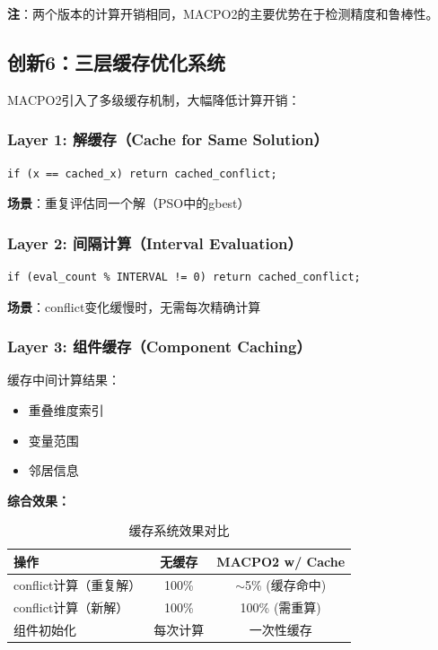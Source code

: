\documentclass[15pt,a3paper]{ctexart}
\begin{document}
\textbf{注}：两个版本的计算开销相同，MACPO2的主要优势在于检测精度和鲁棒性。


\subsection{创新6：三层缓存优化系统}

MACPO2引入了多级缓存机制，大幅降低计算开销：

\subsubsection{Layer 1: 解缓存（Cache for Same Solution）}

\begin{verbatim}
if (x == cached_x) return cached_conflict;
\end{verbatim}

\textbf{场景}：重复评估同一个解（PSO中的gbest）

\subsubsection{Layer 2: 间隔计算（Interval Evaluation）}

\begin{verbatim}
if (eval_count % INTERVAL != 0) return cached_conflict;
\end{verbatim}

\textbf{场景}：conflict变化缓慢时，无需每次精确计算

\subsubsection{Layer 3: 组件缓存（Component Caching）}

缓存中间计算结果：
\begin{itemize}
    \item 重叠维度索引
    \item 变量范围
    \item 邻居信息
\end{itemize}

\textbf{综合效果：}
\begin{table}[h]
\centering
\caption{缓存系统效果对比}
\begin{tabular}{|l|c|c|}
\hline
\textbf{操作} & \textbf{无缓存} & \textbf{MACPO2 w/ Cache} \\
\hline
conflict计算（重复解） & 100\% & $\sim$5\% (缓存命中) \\
conflict计算（新解） & 100\% & 100\% (需重算) \\
组件初始化 & 每次计算 & 一次性缓存 \\
\hline
\end{tabular}
\end{table}
\end{document}

